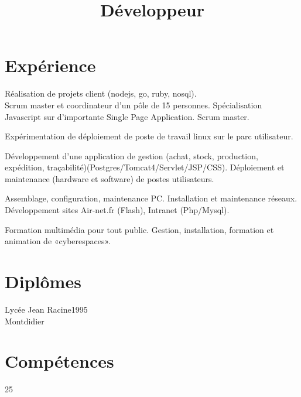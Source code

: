 \documentclass[a4paper,11pt]{cv4tw}
\title{D\'eveloppeur}
\begin{document}
  \section{Exp\'erience}
  {}
  {R\'ealisation de projets client (nodejs, go, ruby, nosql).\\ Scrum master et coordinateur d'un p\^ole de 15 personnes. Sp\'ecialisation Javascript sur d'importante Single Page Application. Scrum master.
  }

  {}
  {Exp\'erimentation de d\'eploiement de poste de travail linux sur le parc utilisateur.}

  {}
  {D\'eveloppement d'une application de gestion (achat, stock, production, exp\'edition, tra\c{c}abilit\'e)(Postgres/Tomcat4/Servlet/JSP/CSS).}
  {}
  {D\'eploiement et maintenance (hardware et software) de postes utilisateurs.}

  {}
  {Assemblage, configuration, maintenance PC. Installation et maintenance r\'eseaux. D\'eveloppement sites Air-net.fr (Flash), Intranet (Php/Mysql).}

  {}
  {Formation multim\'edia pour tout public. Gestion, installation, formation et animation de «cyberespaces».}

  \section{Dipl\^omes}

   {Lyc\'ee Jean Racine}{1995\\Montdidier}{}{}

  \section{Comp\'etences}
  \begin{fields}{}{2}{5}
  \end{fields}
\end{document}
